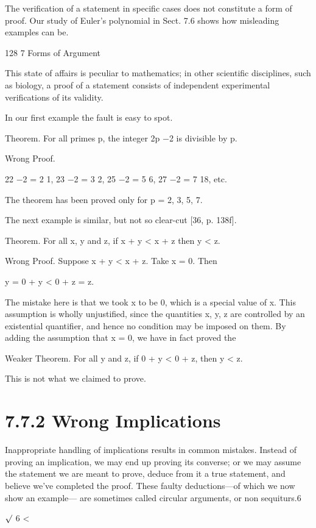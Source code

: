 \documentclass[11pt]{article}
\theoremstyle{plain}
\theoremstyle{definition}
\begin{document}
The verification of a statement in specific cases does not constitute a form of proof. Our study of Euler's polynomial in Sect. 7.6 shows how misleading examples can be.

128 7 Forms of Argument

This state of affairs is peculiar to mathematics; in other scientific disciplines, such as biology, a proof of a statement consists of independent experimental verifications of its validity.

In our first example the fault is easy to spot.

Theorem. For all primes p, the integer 2p $-$2 is divisible by p.

Wrong Proof.

22 $-$2 = 2 \textperiodcentered{} 1, 23 $-$2 = 3 \textperiodcentered{} 2, 25 $-$2 = 5 \textperiodcentered{} 6, 27 $-$2 = 7 \textperiodcentered{} 18, etc. 

The theorem has been proved only for p = 2, 3, 5, 7.

The next example is similar, but not so clear-cut [36, p. 138f].

Theorem. For all x, y and z, if x + y < x + z then y < z.

Wrong Proof. Suppose x + y < x + z. Take x = 0. Then

y = 0 + y < 0 + z = z. 

The mistake here is that we took x to be 0, which is a special value of x. This assumption is wholly unjustified, since the quantities x, y, z are controlled by an existential quantifier, and hence no condition may be imposed on them. By adding the assumption that x = 0, we have in fact proved the

Weaker Theorem. For all y and z, if 0 + y < 0 + z, then y < z.

This is not what we claimed to prove.

\section{7.7.2 Wrong Implications}

Inappropriate handling of implications results in common mistakes. Instead of proving an implication, we may end up proving its converse; or we may assume the statement we are meant to prove, deduce from it a true statement, and believe we've completed the proof. These faulty deductions---of which we now show an example--- are sometimes called circular arguments, or non sequiturs.6

$\surd$ 6 <
\end{document}
